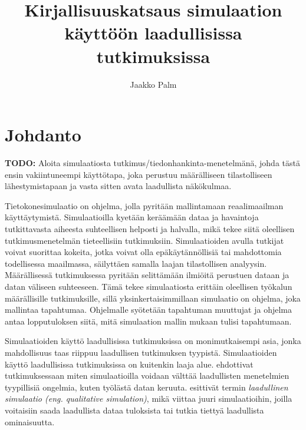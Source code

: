 \documentclass[utf8]{gradu3}
\begin{document}
\title{Kirjallisuuskatsaus simulaation käyttöön laadullisissa tutkimuksissa}
\abstract{%
  
}

\author{Jaakko Palm}

\maketitle

\mainmatter

\chapter{Johdanto}

\textbf{TODO:} Aloita simulaatiosta tutkimus/tiedonhankinta-menetelmänä, johda tästä ensin vakiintuneempi käyttötapa, joka perustuu määrälliseen tilastolliseen lähestymistapaan ja vasta sitten avata laadullista näkökulmaa.

Tietokonesimulaatio on ohjelma, jolla pyritään mallintamaan reaalimaailman käyttäytymistä. Simulaatioilla kyetään keräämään dataa ja havaintoja tutkittavasta aiheesta suhteellisen helposti ja halvalla, mikä tekee siitä oleellisen tutkimusmenetelmän tieteellisiin tutkimuksiin. Simulaatioiden avulla tutkijat voivat suorittaa kokeita, jotka voivat olla epäkäytännöllisiä tai mahdottomia todellisessa maailmassa, säilyttäen samalla laajan tilastollisen analyysin. Määrällisessä tutkimuksessa pyritään selittämään ilmiöitä perustuen dataan ja datan väliseen suhteeseen. Tämä tekee simulaatiosta erittäin oleellisen työkalun määrällisille tutkimuksille, sillä yksinkertaisimmillaan simulaatio on ohjelma, joka mallintaa tapahtumaa. Ohjelmalle syötetään tapahtuman muuttujat ja ohjelma antaa lopputuloksen siitä, mitä simulaation mallin mukaan tulisi tapahtumaan. 

Simulaatioiden käyttö laadullisissa tutkimuksissa on monimutkaisempi asia, jonka mahdollisuus taas riippuu laadullisen tutkimuksen tyypistä. Simulaatioiden käyttö laadullisissa tutkimuksissa on kuitenkin laaja alue. \cite{eldabi2002quantitative} ehdottivat tutkimuksessaan miten simulaatioilla voidaan välttää laadullisten menetelmien tyypillisiä ongelmia, kuten työlästä datan keruuta. \cite{kuipers1986qualitative} esittivät termin \textit{laadullinen simulaatio (eng. qualitative simulation)}, mikä viittaa juuri simulaatioihin, joilla voitaisiin saada laadullista dataa tuloksista tai tutkia tiettyä laadullista ominaisuutta. 
\end{document}
